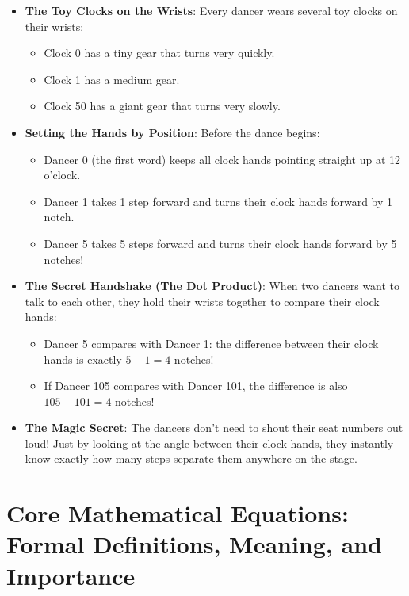 \documentclass[11pt,a4paper]{article}
\theoremstyle{definition}
\begin{document}
\begin{itemize}
    \item \textbf{The Toy Clocks on the Wrists}:
    Every dancer wears several toy clocks on their wrists:
    \begin{itemize}
        \item Clock 0 has a tiny gear that turns very quickly.
        \item Clock 1 has a medium gear.
        \item Clock 50 has a giant gear that turns very slowly.
    \end{itemize}
    
    \item \textbf{Setting the Hands by Position}:
    Before the dance begins:
    \begin{itemize}
        \item Dancer 0 (the first word) keeps all clock hands pointing straight up at 12 o'clock.
        \item Dancer 1 takes 1 step forward and turns their clock hands forward by 1 notch.
        \item Dancer 5 takes 5 steps forward and turns their clock hands forward by 5 notches!
    \end{itemize}
    
    \item \textbf{The Secret Handshake (The Dot Product)}:
    When two dancers want to talk to each other, they hold their wrists together to compare their clock hands:
    \begin{itemize}
        \item Dancer 5 compares with Dancer 1: the difference between their clock hands is exactly $5 - 1 = 4$ notches!
        \item If Dancer 105 compares with Dancer 101, the difference is also $105 - 101 = 4$ notches!
    \end{itemize}
    
    \item \textbf{The Magic Secret}:
    The dancers don't need to shout their seat numbers out loud! Just by looking at the angle between their clock hands, they instantly know exactly how many steps separate them anywhere on the stage.
\end{itemize}

\section{Core Mathematical Equations: Formal Definitions, Meaning, and Importance}
\end{document}

